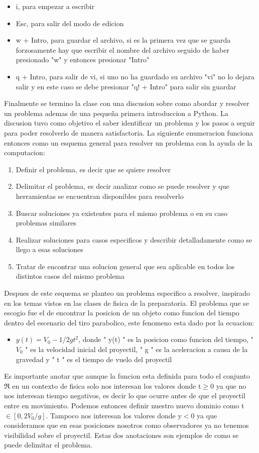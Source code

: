 \documentclass[letterpaper, 12pt, oneside]{article}
\begin{document}
	\begin{itemize}
		\item i, para empezar a escribir
		\item Esc, para salir del modo de edicion
		\item w + Intro, para guardar el archivo, si es la primera vez que se guarda forzosamente hay que escribir el nombre del archivo seguido de haber presionado "w" y entonces presionar "Intro"
		\item q + Intro, para salir de vi, si uno no ha guardado su archivo "vi" no lo dejara salir y en este caso se debe presionar "q! + Intro" para salir sin guardar
	\\
	\end{itemize}
	Finalmente se termino la clase con una discusion sobre como abordar y resolver un problema ademas de una pequeña primera introduccion a Python. La discusion tuvo como objetivo el saber identificar un problema y los pasos a seguir para poder resolverlo de manera satisfactoria. La siguiente enumeracion funciona entonces como un esquema general para resolver un problema con la ayuda de la computacion:
	\begin{enumerate}
		\item Definir el problema, es decir que se quiere resolver
		\item Delimitar el problema, es decir analizar como se puede resolver y que herramientas se encuentran disponibles para resolverlo
		\item Buscar soluciones ya existentes para el mismo problema o en su caso problemas similares
		\item Realizar soluciones para casos especificos y describir detalladamente como se llego a esas soluciones
		\item Tratar de encontrar una solucion general que sea aplicable en todos los distintos casos del mismo problema
	\\
	\end{enumerate}
	Despues de este esquema se planteo un problema especifico a resolver, inspirado en los temas vistos en las clases de fisica de la preparatoria. El problema que se escogio fue el de encontrar la posicion de un objeto como funcion del tiempo dentro del escenario del tiro parabolico, este fenomeno esta dado por la ecuacion:
	\begin{itemize}
		\item $y(t) = V_{0} - 1/2gt^{2}$, donde " y(t) " es la posicion como funcion del tiempo, " $V_{0}$ " es la velocidad inicial del proyectil, " g " es la aceleracion a causa de la gravedad y " t " es el tiempo de vuelo del proyectil
	\\
	\end{itemize}
	Es importante anotar que aunque la funcion esta definida para todo el conjunto $\Re$ en un contexto de fisica solo nos interesan los valores donde t$\geq$0 ya que no nos interesan tiempo negativos, es decir lo que ocurre antes de que el proyectil entre en movimiento. Podemos entonces definir nuestro nuevo dominio como t$\in[0,2V_{0}/g]$. Tampoco nos interesan los valores donde y$<$0 ya que consideramos que en esas posiciones nosotros como observadores ya no tenemos visibilidad sobre el proyectil. Estas dos anotaciones son ejemplos de como se puede delimitar el problema.
\end{document}
